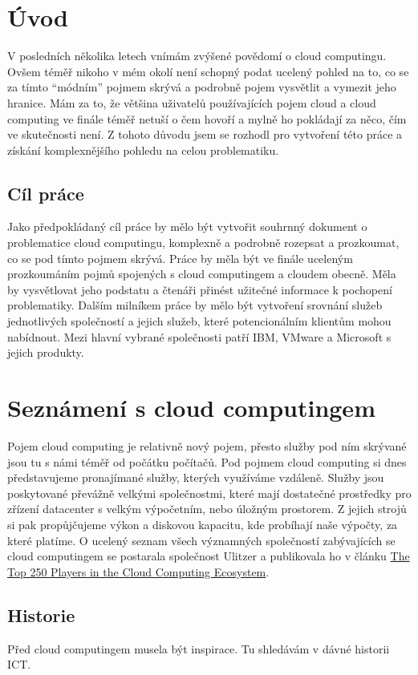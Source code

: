 \section{Úvod}
V posledních několika letech vnímám zvýšené povědomí o cloud computingu. Ovšem téměř nikoho v mém  okolí není schopný podat ucelený pohled na to, co se za tímto "`módním"' pojmem skrývá a podrobně pojem vysvětlit a vymezit jeho hranice. Mám za to, že většina uživatelů používajících pojem cloud a cloud computing ve finále téměř netuší o čem hovoří a mylně ho pokládají za něco, čím ve skutečnosti není. Z tohoto důvodu jsem se rozhodl pro vytvoření této práce a získání komplexnějšího pohledu na celou problematiku.

\subsection{Cíl práce}
Jako předpokládaný cíl práce by mělo být vytvořit souhrnný dokument o problematice cloud computingu, komplexně a podrobně rozepsat a prozkoumat, co se pod tímto pojmem skrývá. Práce by měla být ve finále uceleným prozkoumáním pojmů spojených s cloud computingem a cloudem obecně. Měla by vysvětlovat jeho podstatu a čtenáři přinést užitečné informace k pochopení problematiky. Dalším milníkem práce by mělo být vytvoření srovnání služeb jednotlivých společností a jejich služeb, které potencionálním klientům mohou nabídnout. Mezi hlavní vybrané společnosti patří IBM, VMware a Microsoft s jejich produkty.

\newpage
\section{Seznámení s cloud computingem}
Pojem cloud computing je relativně nový pojem, přesto služby pod ním skrývané jsou tu s námi téměř od počátku počítačů. Pod pojmem cloud computing si dnes představujeme pronajímané služby, kterých využíváme vzdáleně. Služby jsou poskytované převážně velkými společnostmi, které mají dostatečné prostředky pro zřízení datacenter s velkým výpočetním, nebo úložným prostorem. Z jejich strojů si pak propůjčujeme výkon a diskovou kapacitu, kde probíhají naše výpočty, za které platíme. O ucelený seznam všech významných společností zabývajících se cloud computingem se postarala společnost Ulitzer a publikovala ho v článku \href{http://web2.sys-con.com/node/1386896}{The Top 250 Players in the Cloud Computing Ecosystem\cite{syscon:top250}}.

\subsection{Historie}
Před cloud computingem musela být inspirace. Tu shledávám v dávné historii ICT.


